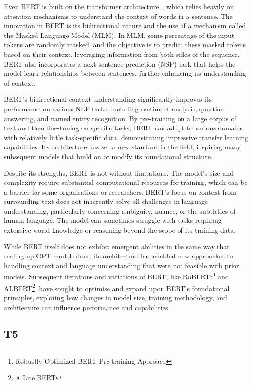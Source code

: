 Even BERT is built on the transformer architecture~\cite{vaswani2023attention}, which relies heavily on attention mechanisms to understand the context of words in a sentence.
The innovation in BERT is its bidirectional nature and the use of a mechanism called the Masked Language Model (MLM). In MLM, some percentage of the input tokens are randomly masked, and the objective is to predict these masked tokens based on their context, leveraging information from both sides of the sequence.
BERT also incorporates a next-sentence prediction (NSP) task that helps the model learn relationships between sentences, further enhancing its understanding of context.

BERT's bidirectional context understanding significantly improves its performance on various NLP tasks, including sentiment analysis, question answering, and named entity recognition.
By pre-training on a large corpus of text and then fine-tuning on specific tasks, BERT can adapt to various domains with relatively little task-specific data, demonstrating impressive transfer learning capabilities.
Its architecture has set a new standard in the field, inspiring many subsequent models that build on or modify its foundational structure.

Despite its strengths, BERT is not without limitations.
The model's size and complexity require substantial computational resources for training, which can be a barrier for some organisations or researchers.
BERT's focus on context from surrounding text does not inherently solve all challenges in language understanding, particularly concerning ambiguity, nuance, or the subtleties of human language.
The model can sometimes struggle with tasks requiring extensive world knowledge or reasoning beyond the scope of its training data.

While BERT itself does not exhibit emergent abilities in the same way that scaling up GPT models does, its architecture has enabled new approaches to handling context and language understanding that were not feasible with prior models.
Subsequent iterations and variations of BERT, like RoBERTa\footnote{Robustly Optimized BERT Pre-training Approach} and ALBERT\footnote{A Lite BERT}, have sought to optimise and expand upon BERT's foundational principles, exploring how changes in model size, training methodology, and architecture can influence performance and capabilities.

\subsection{T5}
\label{subsec:t5}

